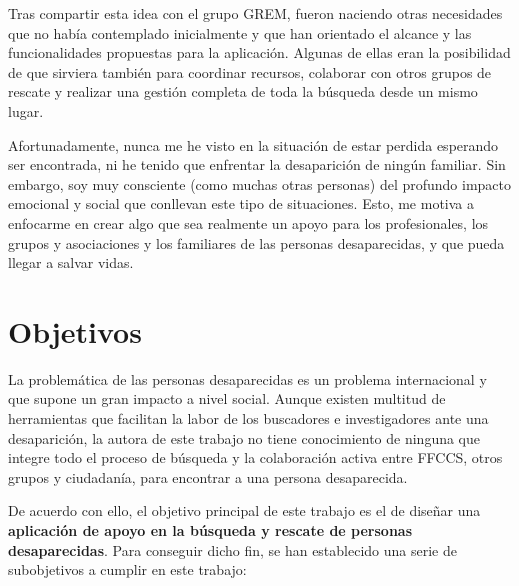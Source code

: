     Tras compartir esta idea con el grupo GREM, fueron naciendo otras necesidades que no había contemplado inicialmente y que han orientado el alcance y las funcionalidades propuestas para la aplicación. Algunas de ellas eran la posibilidad de que sirviera también para coordinar recursos, colaborar con otros grupos de rescate y realizar una gestión completa de toda la búsqueda desde un mismo lugar.

    Afortunadamente, nunca me he visto en la situación de estar perdida esperando ser encontrada, ni he tenido que enfrentar la desaparición de ningún familiar. Sin embargo, soy muy consciente (como muchas otras personas) del profundo impacto emocional y social que conllevan este tipo de situaciones. Esto, me motiva a enfocarme en crear algo que sea realmente un apoyo para los profesionales, los grupos y asociaciones y los familiares de las personas desaparecidas, y que pueda llegar a salvar vidas. 


    \section{Objetivos}\label{obj}

    La problemática de las personas desaparecidas es un problema internacional y que supone un gran impacto a nivel social. Aunque existen multitud de herramientas que facilitan la labor de los buscadores e investigadores ante una desaparición, la autora de este trabajo no tiene conocimiento de ninguna que integre todo el proceso de búsqueda y la colaboración activa entre FFCCS, otros grupos y ciudadanía, para encontrar a una persona desaparecida.
    
    De acuerdo con ello, el objetivo principal de este trabajo es el de diseñar una \textbf{aplicación de apoyo en la búsqueda y rescate de personas desaparecidas}. Para conseguir dicho fin, se han establecido una serie de subobjetivos a cumplir en este trabajo:
    
